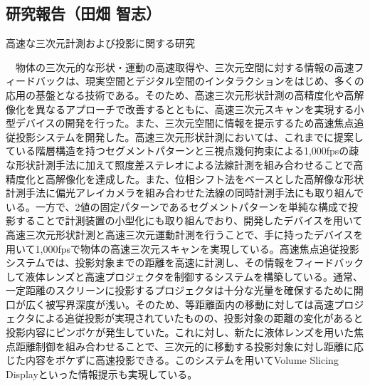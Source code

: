 \subsection{研究報告（田畑 智志）}

高速な三次元計測および投影に関する研究

　物体の三次元的な形状・運動の高速取得や、三次元空間に対する情報の高速フィードバックは、現実空間とデジタル空間のインタラクションをはじめ、多くの応用の基盤となる技術である。そのため、高速三次元形状計測の高精度化や高解像化を異なるアプローチで改善するとともに、高速三次元スキャンを実現する小型デバイスの開発を行った。また、三次元空間に情報を提示するため高速焦点追従投影システムを開発した。高速三次元形状計測においては、これまでに提案している階層構造を持つセグメントパターンと三視点幾何拘束による1,000fpsの疎な形状計測手法に加えて照度差ステレオによる法線計測を組み合わせることで高精度化と高解像化を達成した。また、位相シフト法をベースとした高解像な形状計測手法に偏光アレイカメラを組み合わせた法線の同時計測手法にも取り組んでいる。一方で、2値の固定パターンであるセグメントパターンを単純な構成で投影することで計測装置の小型化にも取り組んでおり、開発したデバイスを用いて高速三次元形状計測と高速三次元運動計測を行うことで、手に持ったデバイスを用いて1,000fpsで物体の高速三次元スキャンを実現している。高速焦点追従投影システムでは、投影対象までの距離を高速に計測し、その情報をフィードバックして液体レンズと高速プロジェクタを制御するシステムを構築している。通常、一定距離のスクリーンに投影するプロジェクタは十分な光量を確保するために開口が広く被写界深度が浅い。そのため、等距離面内の移動に対しては高速プロジェクタによる追従投影が実現されていたものの、投影対象の距離の変化があると投影内容にピンボケが発生していた。これに対し、新たに液体レンズを用いた焦点距離制御を組み合わせることで、三次元的に移動する投影対象に対し距離に応じた内容をボケずに高速投影できる。このシステムを用いてVolume Slicing Displayといった情報提示も実現している。

